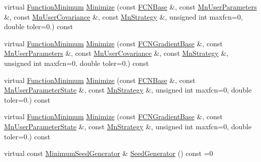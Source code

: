 \begin{DoxyCompactItemize}
virtual \mbox{\hyperlink{classROOT_1_1Minuit2_1_1FunctionMinimum}{Function\+Minimum}} \mbox{\hyperlink{classROOT_1_1Minuit2_1_1ModularFunctionMinimizer_acb99ccb1a23b88947ee5996c03c584ff}{Minimize}} (const \mbox{\hyperlink{classROOT_1_1Minuit2_1_1FCNBase}{F\+C\+N\+Base}} \&, const \mbox{\hyperlink{classROOT_1_1Minuit2_1_1MnUserParameters}{Mn\+User\+Parameters}} \&, const \mbox{\hyperlink{classROOT_1_1Minuit2_1_1MnUserCovariance}{Mn\+User\+Covariance}} \&, const \mbox{\hyperlink{classROOT_1_1Minuit2_1_1MnStrategy}{Mn\+Strategy}} \&, unsigned int maxfcn=0, double toler=0.) const
\item 
virtual \mbox{\hyperlink{classROOT_1_1Minuit2_1_1FunctionMinimum}{Function\+Minimum}} \mbox{\hyperlink{classROOT_1_1Minuit2_1_1ModularFunctionMinimizer_a79a1879062ddd4959716be08c519954e}{Minimize}} (const \mbox{\hyperlink{classROOT_1_1Minuit2_1_1FCNGradientBase}{F\+C\+N\+Gradient\+Base}} \&, const \mbox{\hyperlink{classROOT_1_1Minuit2_1_1MnUserParameters}{Mn\+User\+Parameters}} \&, const \mbox{\hyperlink{classROOT_1_1Minuit2_1_1MnUserCovariance}{Mn\+User\+Covariance}} \&, const \mbox{\hyperlink{classROOT_1_1Minuit2_1_1MnStrategy}{Mn\+Strategy}} \&, unsigned int maxfcn=0, double toler=0.) const
\item 
virtual \mbox{\hyperlink{classROOT_1_1Minuit2_1_1FunctionMinimum}{Function\+Minimum}} \mbox{\hyperlink{classROOT_1_1Minuit2_1_1ModularFunctionMinimizer_ad001dbb0a2d17022eb0818b4eddc2af9}{Minimize}} (const \mbox{\hyperlink{classROOT_1_1Minuit2_1_1FCNBase}{F\+C\+N\+Base}} \&, const \mbox{\hyperlink{classROOT_1_1Minuit2_1_1MnUserParameterState}{Mn\+User\+Parameter\+State}} \&, const \mbox{\hyperlink{classROOT_1_1Minuit2_1_1MnStrategy}{Mn\+Strategy}} \&, unsigned int maxfcn=0, double toler=0.) const
\item 
virtual \mbox{\hyperlink{classROOT_1_1Minuit2_1_1FunctionMinimum}{Function\+Minimum}} \mbox{\hyperlink{classROOT_1_1Minuit2_1_1ModularFunctionMinimizer_a695166fd33368026170d6e2224cb2b7a}{Minimize}} (const \mbox{\hyperlink{classROOT_1_1Minuit2_1_1FCNGradientBase}{F\+C\+N\+Gradient\+Base}} \&, const \mbox{\hyperlink{classROOT_1_1Minuit2_1_1MnUserParameterState}{Mn\+User\+Parameter\+State}} \&, const \mbox{\hyperlink{classROOT_1_1Minuit2_1_1MnStrategy}{Mn\+Strategy}} \&, unsigned int maxfcn=0, double toler=0.) const
\item 
virtual const \mbox{\hyperlink{classROOT_1_1Minuit2_1_1MinimumSeedGenerator}{Minimum\+Seed\+Generator}} \& \mbox{\hyperlink{classROOT_1_1Minuit2_1_1ModularFunctionMinimizer_a742930de97b0ce9ba23773874ae0894b}{Seed\+Generator}} () const =0

\end{DoxyCompactItemize}
